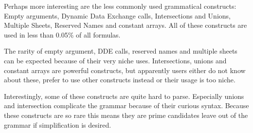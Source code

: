 Perhaps more interesting are the less commonly used grammatical constructs: Empty arguments, Dynamic Data Exchange calls, Intersections and Unions, Multiple Sheets, Reserved Names and constant arrays.
All of these constructs are used in less than 0.05\% of all formulas.

The rarity of empty argument, DDE calls, reserved names and multiple sheets can be expected because of their very niche uses.
Intersections, unions and constant arrays are powerful constructs, but apparently users either do not know about these, prefer to use other constructs instead or their usage is too niche.

Interestingly, some of these constructs are quite hard to parse.
Especially unions and intersection complicate the grammar because of their curious syntax.
Because these constructs are so rare this means they are prime candidates leave out of the grammar if simplification is desired.
